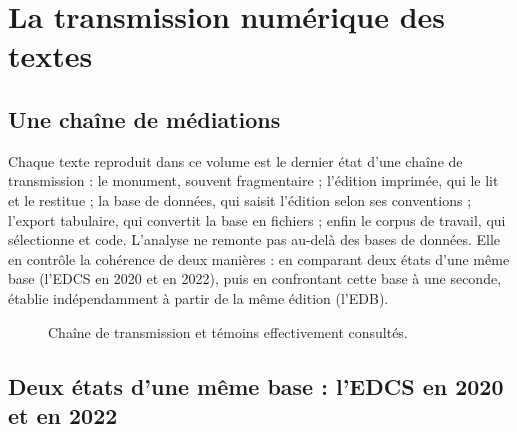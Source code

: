 \chapter{La transmission numérique des textes}\label{ch:transmission}

\section{Une chaîne de médiations}

Chaque texte reproduit dans ce volume est le dernier état d’une chaîne de transmission : le monument, souvent fragmentaire ; l’édition imprimée, qui le lit et le restitue ; la base de données, qui saisit l’édition selon ses conventions ; l’export tabulaire, qui convertit la base en fichiers ; enfin le corpus de travail, qui sélectionne et code. L’analyse ne remonte pas au-delà des bases de données. Elle en contrôle la cohérence de deux manières : en comparant deux états d’une même base (l’EDCS en 2020 et en 2022), puis en confrontant cette base à une seconde, établie indépendamment à partir de la même édition (l’EDB).

\begin{figure}[tbp]\centering\small
{}
\caption{Chaîne de transmission et témoins effectivement consultés.}\label{fig:chaine}
\end{figure}

\section{Deux états d’une même base : l’EDCS en 2020 et en 2022}


